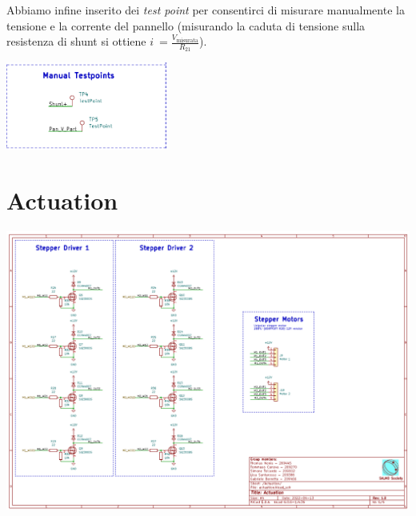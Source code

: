 \noindent Abbiamo infine inserito dei \textit{test point} per consentirci di misurare
manualmente la tensione e la corrente del pannello (misurando la caduta
di tensione sulla resistenza di shunt si ottiene
\(i\  = \frac{V_{\text{misurata}}}{R_{21}}\)).

\begin{center}
\includegraphics[width=0.4\textwidth]{figures/image70.png}
\captionsetup{type=figure}
\end{center}

\hypertarget{actuation}{%
\section{Actuation}\label{actuation}}

\begin{center}
\includegraphics[scale=0.5]{figures/image41.png}
\captionsetup{type=figure}
\end{center}

